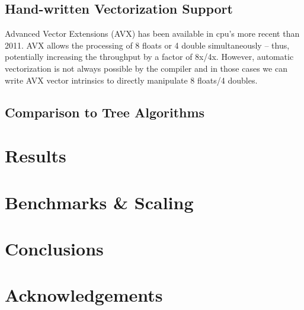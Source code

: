 \documentclass[preprint,authoryear,12pt]{elsarticle}
\begin{document}




\subsection{Hand-written Vectorization Support}
Advanced Vector Extensions (AVX) has been available in cpu's more recent than 2011. AVX allows the processing of 8 floats or 4 double simultaneously -- thus, 
potentially increasing the throughput by a factor of 8x/4x. However, automatic vectorization is not always possible by the compiler and in those cases 
we can write AVX vector intrinsics to directly manipulate 8 floats/4 doubles. 


\subsection{Comparison to Tree Algorithms}

\section{Results}

\section{Benchmarks \& Scaling}

\section{Conclusions}

\citet{foreman-mackey_etal_13}

\section*{Acknowledgements}



\end{document}
